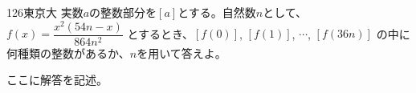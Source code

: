 \begin{thm}{126}{}{東京大}
 実数$a$の整数部分を$[a]$とする。自然数$n$として、$f(x)=\dfrac{x^2(54n-x)}{864n^2}$ とするとき、$[f(0)]$, $[f(1)]$, $\cdots$, $[f(36n)]$ の中に何種類の整数があるか、$n$を用いて答えよ。
\end{thm}

ここに解答を記述。
